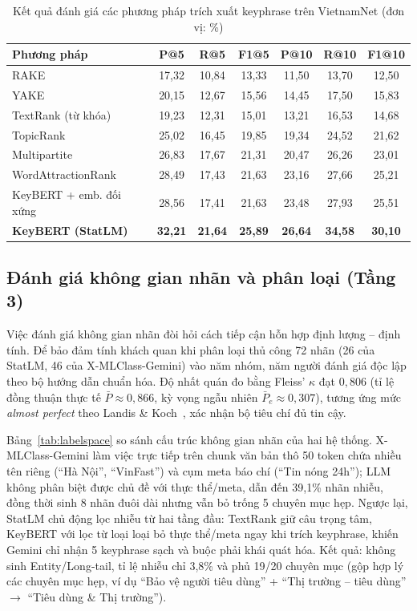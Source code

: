 \begin{table}[!t]
\renewcommand{\arraystretch}{1.2}
\caption{Kết quả đánh giá các phương pháp trích xuất keyphrase trên VietnamNet (đơn vị: \%)}
\label{tab:keyphrase}
\centering
\scriptsize
\setlength{\tabcolsep}{4pt}
\begin{tabular}{@{}lcccccc@{}}
\toprule
\textbf{Phương pháp} & \textbf{P@5} & \textbf{R@5} & \textbf{F1@5} & \textbf{P@10} & \textbf{R@10} & \textbf{F1@10} \\
\midrule
RAKE                       & 17,32 & 10,84 & 13,33 & 11,50 & 13,70 & 12,50 \\
YAKE                       & 20,15 & 12,67 & 15,56 & 14,45 & 17,50 & 15,83 \\
TextRank (từ khóa)         & 19,23 & 12,31 & 15,01 & 13,21 & 16,53 & 14,68 \\
TopicRank                  & 25,02 & 16,45 & 19,85 & 19,34 & 24,52 & 21,62 \\
Multipartite               & 26,83 & 17,67 & 21,31 & 20,47 & 26,26 & 23,01 \\
WordAttractionRank         & 28,49 & 17,43 & 21,63 & 23,16 & 27,66 & 25,21 \\
KeyBERT + emb. đối xứng     & 28,56 & 17,41 & 21,63 & 23,48 & 27,93 & 25,51 \\
\textbf{KeyBERT (StatLM)}  & \textbf{32,21} & \textbf{21,64} & \textbf{25,89} & \textbf{26,64} & \textbf{34,58} & \textbf{30,10} \\
\bottomrule
\end{tabular}
\end{table}

\subsection{Đánh giá không gian nhãn và phân loại (Tầng 3)}
Việc đánh giá không gian nhãn đòi hỏi cách tiếp cận hỗn hợp định lượng -- định
tính. Để bảo đảm tính khách quan khi phân loại thủ công 72 nhãn (26 của StatLM,
46 của X-MLClass-Gemini) vào năm nhóm, năm người đánh giá độc lập theo bộ hướng dẫn chuẩn
hóa. Độ nhất quán đo bằng Fleiss' $\kappa$ đạt $0{,}806$ (tỉ lệ đồng thuận thực
tế $\bar P\approx 0{,}866$, kỳ vọng ngẫu nhiên $\bar P_e\approx 0{,}307$), tương
ứng mức \emph{almost perfect} theo Landis \& Koch~\cite{landis1977}, xác nhận bộ
tiêu chí đủ tin cậy.

Bảng~\ref{tab:labelspace} so sánh cấu trúc không gian nhãn của hai hệ thống.
X-MLClass-Gemini làm việc trực tiếp trên chunk văn bản thô 50 token chứa nhiều tên riêng (``Hà
Nội'', ``VinFast'') và cụm meta báo chí (``Tin nóng 24h''); LLM không phân biệt
được chủ đề với thực thể/meta, dẫn đến 39,1\% nhãn nhiễu, đồng thời sinh 8 nhãn
đuôi dài nhưng vẫn bỏ trống 5 chuyên mục hẹp. Ngược lại, StatLM chủ động lọc
nhiễu từ hai tầng đầu: TextRank giữ câu trọng tâm, KeyBERT với lọc từ loại loại
bỏ thực thể/meta ngay khi trích keyphrase, khiến Gemini chỉ nhận 5 keyphrase sạch
và buộc phải khái quát hóa. Kết quả: không sinh Entity/Long-tail, tỉ lệ nhiễu chỉ
3,8\% và phủ 19/20 chuyên mục (gộp hợp lý các chuyên mục hẹp, ví dụ ``Bảo vệ
người tiêu dùng'' + ``Thị trường -- tiêu dùng'' $\rightarrow$ ``Tiêu dùng \& Thị
trường'').

